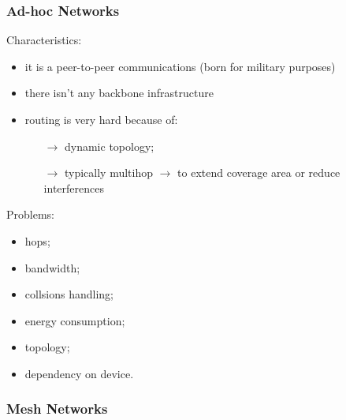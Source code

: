 \subsubsection{Ad-hoc Networks}

Characteristics:
\begin{itemize}
    \item it is a peer-to-peer communications (born for military purposes)
    \item there isn't any backbone infrastructure
    \item routing is very hard because of:
    \begin{itemize}
        \item[$\rightarrow$] dynamic topology;
        \item[$\rightarrow$] typically multihop $\rightarrow$ to
        extend coverage area or reduce interferences
    \end{itemize}
\end{itemize}

Problems:
\begin{multicols}{2}
\begin{itemize}
    \item hops;
    \item bandwidth;
    \item collsions handling;
\end{itemize}
\begin{itemize}
    \item energy consumption;
    \item topology;
    \item dependency on device.
\end{itemize}
\end{multicols}

\subsubsection{Mesh Networks}